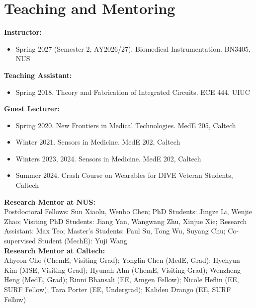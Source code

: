 \documentclass[11pt,a4paper]{article}
\begin{document}
\section{Teaching and Mentoring}
\textbf{Instructor:}
\begin{itemize}[leftmargin=*, itemsep=2pt, parsep=0pt, topsep=2pt]
  \item Spring 2027 (Semester 2, AY2026/27). Biomedical Instrumentation. BN3405, NUS
\end{itemize}
\vspace{6pt}
\textbf{Teaching Assistant:}
\begin{itemize}[leftmargin=*, itemsep=2pt, parsep=0pt, topsep=2pt]
  \item Spring 2018. Theory and Fabrication of Integrated Circuits. ECE 444, UIUC
\end{itemize}
\textbf{Guest Lecturer:}
\begin{itemize}[leftmargin=*, itemsep=2pt, parsep=0pt, topsep=2pt]
  \item Spring 2020. New Frontiers in Medical Technologies. MedE 205, Caltech
  \item Winter 2021. Sensors in Medicine. MedE 202, Caltech
  \item Winters 2023, 2024. Sensors in Medicine. MedE 202, Caltech
  \item Summer 2024. Crash Course on Wearables for DIVE Veteran Students, Caltech
\end{itemize}
\textbf{Research Mentor at NUS:} \\
Postdoctoral Fellows: Sun Xiaolu, Wenbo Chen; PhD Students: Jingze Li, Wenjie Zhao; Visiting PhD Students: Jiang Yan, Wangwang Zhu, Xinjue Xie; Research Assistant: Max Teo; Master's Students: Paul Su, Tong Wu, Suyang Chu; Co-supervised Student (MechE): Yuji Wang \\
\textbf{Research Mentor at Caltech:} \\
Ahyeon Cho (ChemE, Visiting Grad); Yonglin Chen (MedE, Grad); Hyehyun Kim (MSE, Visiting Grad); Hyunah Ahn (ChemE, Visiting Grad); Wenzheng Heng (MedE, Grad); Rinni Bhansali (EE, Amgen Fellow); Nicole Heflin (EE, SURF Fellow); Tara Porter (EE, Undergrad); Kaliden Drango (EE, SURF Fellow) \\
\end{document}
